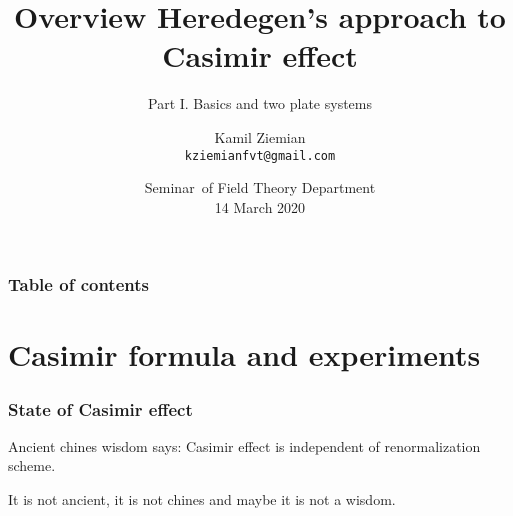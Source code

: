 \documentclass[10pt,t]{beamer}
\title{Overview Heredegen's approach to Casimir effect}
\subtitle{Part I. Basics and two plate systems}
\author{Kamil Ziemian \\
  \texttt{kziemianfvt@gmail.com}}
\institute{Uniwersytet Jagielloński w~Krakowie}
\date[14 March 2020]{Seminar~of Field Theory Department \\
  14 March 2020}
\begin{document}





\maketitle %





\begin{frame}
  \frametitle{Table of contents}


  \tableofcontents %

\end{frame}










\section{Casimir formula and experiments}



\begin{frame}
  \frametitle{State of Casimir effect}


  Ancient chines wisdom says: Casimir effect is independent of
  renormalization scheme.

  It is not ancient, it is not chines and maybe it is not a wisdom.

\end{frame}
\end{document}
